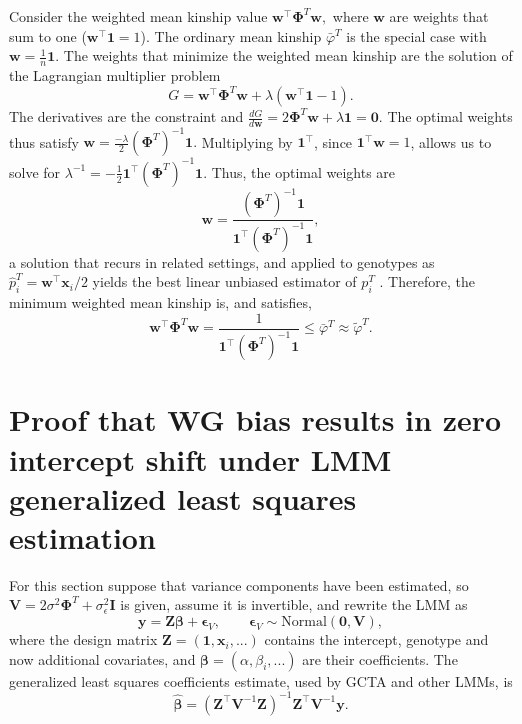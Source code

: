 \documentclass[9pt,twocolumn,twoside]{gsajnl}
\newcommand{\pit}{p_i^T}
\newcommand{\pith}{\hat{p}_i^T}
\newcommand{\kinMat}[1][T]{\mathbf{\Phi}^{#1}}
\begin{document}
\begin{appendices}
  Consider the weighted mean kinship value
  $
  \mathbf{w}^\intercal \kinMat \mathbf{w},
  $
  where $\mathbf{w}$ are weights that sum to one ($\mathbf{w}^\intercal \mathbf{1} = 1$).
  The ordinary mean kinship $\bar{\varphi}^T$ is the special case with $\mathbf{w} = \frac{1}{n} \mathbf{1}$.
  The weights that minimize the weighted mean kinship are the solution of the Lagrangian multiplier problem
  $$
  G = \mathbf{w}^\intercal \kinMat \mathbf{w} + \lambda (\mathbf{w}^\intercal \mathbf{1} - 1).
  $$
  The derivatives are the constraint and
  $
  \frac{dG}{d \mathbf{w}}
  =
  2 \kinMat \mathbf{w} + \lambda \mathbf{1} = \mathbf{0}.
  $
  The optimal weights thus satisfy
  $
  \mathbf{w} = \frac{-\lambda}{2} \left( \kinMat \right)^{-1} \mathbf{1}.
  $
  Multiplying by $\mathbf{1}^\intercal$, since $\mathbf{1}^\intercal \mathbf{w} = 1$, allows us to solve for 
  $
  \lambda^{-1} = - \frac{1}{2} \mathbf{1}^\intercal \left( \kinMat \right)^{-1} \mathbf{1}.
  $
  Thus, the optimal weights are
  $$
  \mathbf{w}
  = 
  \frac{ \left( \kinMat \right)^{-1} \mathbf{1} }{ \mathbf{1}^\intercal \left( \kinMat \right)^{-1} \mathbf{1} }
  ,
  $$
  a solution that recurs in related settings, and applied to genotypes as $\pith = \mathbf{w}^\intercal \mathbf{x}_i / 2$ yields the best linear unbiased estimator of $\pit$ \citep{altschul_weights_1989, astle_population_2009, thornton_roadtrips:_2010}.
  Therefore, the minimum weighted mean kinship is, and satisfies,
  $$
  \mathbf{w}^\intercal \kinMat \mathbf{w}
  =
  \frac{ 1 }{ \mathbf{1}^\intercal \left( \kinMat \right)^{-1} \mathbf{1} }
  \le
  \bar{\varphi}^T
  \approx
  \tilde{\varphi}^T
  .
  $$
    
  \section{Proof that WG bias results in zero intercept shift under LMM generalized least squares estimation}

  \label{sec:wg_gls}

  For this section suppose that variance components have been estimated, so $\mathbf{V} = 2 \sigma^2 \kinMat + \sigma^2_\epsilon \mathbf{I}$ is given, assume it is invertible, and rewrite the LMM as
  $$
  \mathbf{y}
  =
  \mathbf{Z} \boldsymbol{\beta} + \boldsymbol{\epsilon}_V,
  \quad\quad
  \boldsymbol{\epsilon}_V \sim \text{Normal} \left( \mathbf{0}, \mathbf{V} \right),
  $$
  where the design matrix $\mathbf{Z} = (\mathbf{1}, \mathbf{x}_i, ...)$ contains the intercept, genotype and now additional covariates, and $\boldsymbol{\beta} = (\alpha, \beta_i, ...)$ are their coefficients.
  The generalized least squares coefficients estimate, used by GCTA and other LMMs, is
  $$
  \boldsymbol{\hat{\beta}} = \left( \mathbf{Z}^\intercal \mathbf{V}^{-1} \mathbf{Z} \right)^{-1} \mathbf{Z}^\intercal \mathbf{V}^{-1} \mathbf{y}.
  $$


\end{appendices}
\end{document}
